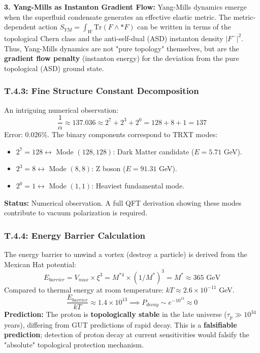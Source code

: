 \textbf{3. Yang-Mills as Instanton Gradient Flow:}
Yang-Mills dynamics emerge when the superfluid condensate generates an effective elastic metric. The metric-dependent action $S_{YM} = \int_W \text{Tr}(F \wedge *F)$ can be written in terms of the topological Chern class and the anti-self-dual (ASD) instanton density $|F^-|^2$.
Thus, Yang-Mills dynamics are not "pure topology" themselves, but are the \textbf{gradient flow penalty} (instanton energy) for the deviation from the pure topological (ASD) ground state.

\subsubsection{T.4.3: Fine Structure Constant Decomposition}
An intriguing numerical observation:
\begin{equation}
    \frac{1}{\alpha} \approx 137.036 \approx 2^7 + 2^3 + 2^0 = 128 + 8 + 1 = 137
\end{equation}
Error: 0.026\%. The binary components correspond to TRXT modes:
\begin{itemize}
    \item $2^7 = 128 \leftrightarrow$ Mode $(128, 128)$: Dark Matter candidate ($E = 5.71$ GeV).
    \item $2^3 = 8 \leftrightarrow$ Mode $(8, 8)$: Z boson ($E = 91.31$ GeV).
    \item $2^0 = 1 \leftrightarrow$ Mode $(1, 1)$: Heaviest fundamental mode.
\end{itemize}
\textbf{Status:} Numerical observation. A full QFT derivation showing these modes contribute to vacuum polarization is required.

\subsubsection{T.4.4: Energy Barrier Calculation}
The energy barrier to unwind a vortex (destroy a particle) is derived from the Mexican Hat potential:
\begin{equation}
    E_{barrier} = V_{max} \times \xi^3 = M^{*4} \times (1/M^*)^3 = M^* \approx 365 \text{ GeV}
\end{equation}
Compared to thermal energy at room temperature: $kT \approx 2.6 \times 10^{-11}$ GeV.
\begin{equation}
    \frac{E_{barrier}}{kT} \approx 1.4 \times 10^{13} \implies P_{decay} \sim e^{-10^{13}} \approx 0
\end{equation}
\textbf{Prediction:} The proton is \textbf{topologically stable} in the late universe ($\tau_p \gg 10^{34}$ years), differing from GUT predictions of rapid decay. This is a \textbf{falsifiable prediction}; detection of proton decay at current sensitivities would falsify the "absolute" topological protection mechanism.

